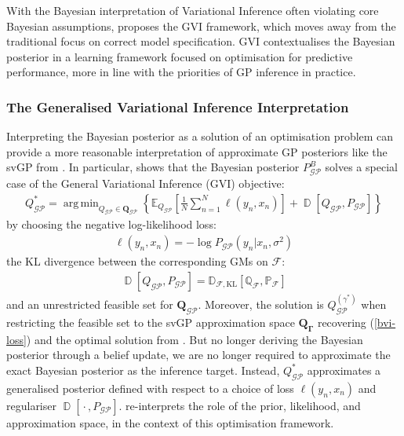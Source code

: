 \documentclass{article}
\newcommand{\D}{\operatorname{\mathbb{D}}}
\newcommand{\GP}{\operatorname{\mathcal{GP}}}
\newcommand{\wc}{\operatorname{{}\cdot{}}}
\DeclareMathOperator*{\argmin}{arg\,min}
\numberwithin{equation}{section}
\begin{document}
With the Bayesian interpretation of Variational Inference often violating core Bayesian assumptions, \cite{knoblauch2022optimization} proposes the GVI framework, which moves away from the traditional focus on correct model specification. GVI contextualises the Bayesian posterior in a learning framework focused on optimisation for predictive performance, more in line with the priorities of GP inference in practice.

\subsubsection{The Generalised Variational Inference Interpretation}
Interpreting the Bayesian posterior as a solution of an optimisation problem can provide a more reasonable interpretation of approximate GP posteriors like the svGP from \cite{titsias2009variational}. In particular, \cite{knoblauch2022optimization} shows that the Bayesian posterior $P_{\GP}^B$ solves a special case of the General Variational Inference (GVI) objective:
\begin{align}
Q_{\GP}^* = \argmin_{Q_{\GP} \in \boldsymbol{Q}_{\GP}} \left\{ \mathbb{E}_{Q_{\GP}}\left[\frac{1}{N}\sum_{n=1}^N \ell(y_n, x_n)\right] + \D\left[Q_{\GP}, P_{\GP}\right]\right\}
\label{general-posterior}
\end{align}
by choosing the negative log-likelihood loss:
\begin{align}
    \ell(y_n, x_n) = -\log P_{\GP}\left(y_n \vert x_n, \sigma^2\right)
\end{align}
the KL divergence between the corresponding GMs on $\mathcal{F}$:
\begin{align}
    \D \left[Q_{\GP}, P_{\GP}\right] = \mathbb{D}_{\mathcal{F}, \text{KL}}\left[\mathbb{Q}_{\mathcal{F}}, \mathbb{P}_{\mathcal{F}}\right]
\end{align}
and an unrestricted feasible set for $\boldsymbol{Q}_{\GP}$. Moreover, the solution is $Q_{\GP}^{(\gamma^*)}$ when restricting the feasible set to the svGP approximation space $\boldsymbol{Q}_{\boldsymbol{\Gamma}}$ recovering (\ref{bvi-loss}) and the optimal solution from \cite{titsias2009variational}. But no longer deriving the Bayesian posterior through a belief update, we are no longer required to approximate the exact Bayesian posterior as the inference target. Instead, $Q_{\GP}^*$ approximates a generalised posterior defined with respect to a choice of loss $\ell(y_n, x_n)$ and regulariser $\D\left[\wc, P_{\GP}\right]$. \cite{knoblauch2022optimization} re-interprets the role of the prior, likelihood, and approximation space, in the context of this optimisation framework.
\end{document}
